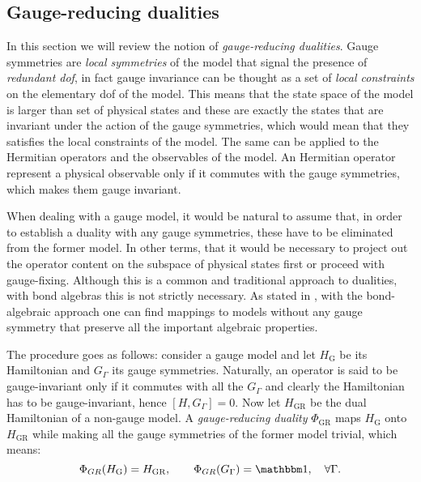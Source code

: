 %
%
\subsection{Gauge-reducing dualities}%
\label{sub:gauge_reducing_dualities}

In this section we will review the notion of \emph{gauge-reducing dualities}.
Gauge symmetries are \emph{local symmetries} of the model that signal the presence of \emph{redundant \ac{dof}}, in fact gauge invariance can be thought as a set of \emph{local constraints} on the elementary \ac{dof} of the model.
This means that the state space of the model is larger than set of physical states and these are exactly the states that are invariant under the action of the gauge symmetries, which would mean that they satisfies the local constraints of the model.
The same can be applied to the Hermitian operators and the observables of the model.
An Hermitian operator represent a physical observable only if it commutes with the gauge symmetries, which makes them gauge invariant.

When dealing with a gauge model, it would be natural to assume that, in order to establish a duality with any gauge symmetries, these have to be eliminated from the former model.
In other terms, that it would be necessary to project out the operator content on the subspace of physical states first or proceed with gauge-fixing.
Although this is a common and traditional approach to dualities, with bond algebras this is not strictly necessary.
As stated in \cite{cobanera2011bond}, with the bond-algebraic approach one can find mappings to models without any gauge symmetry that preserve all the important algebraic properties.

The procedure goes as follows: consider a gauge model and let $H_{\text{G}}$ be its Hamiltonian and $G_{\Gamma}$ its gauge symmetries.
Naturally, an operator is said to be gauge-invariant only if it commutes with all the $G_{\Gamma}$ and
clearly the Hamiltonian has to be gauge-invariant, hence $[H, G_{\Gamma}] = 0$.
Now let $H_{\text{GR}}$ be the dual Hamiltonian of a non-gauge model.
A \emph{gauge-reducing duality} $\Phi_{\text{GR}}$ maps $H_{\text{G}}$ onto $H_{\text{GR}}$ while making all the gauge symmetries of the former model trivial, which means:
\begin{equation}
    \Phi_{GR}(H_{\text{G}}) = H_{\text{GR}}, \qquad
    \Phi_{GR}(G_{\Gamma}) = \identity, \quad \forall \Gamma.
\end{equation}

